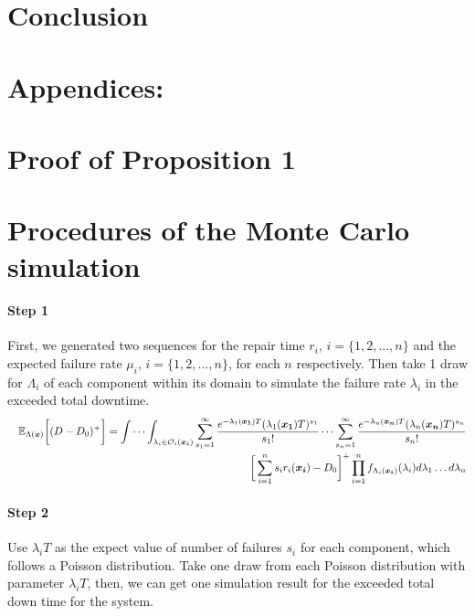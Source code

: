 \documentclass[preprint,12pt]{elsarticle}
\begin{document}
\section{Conclusion}
\section{Appendices:}
\appendix
\section{Proof of Proposition 1}
\label{Pro1}
\section{Procedures of the Monte Carlo simulation}
\paragraph{Step 1}

First, we generated two sequences for the repair time $r_{i}$, $i=\{1,2,...,n\}$ and the expected failure rate $\mu_{i}$, $i=\{1,2,...,n\}$, for each $n$ respectively. Then take 1 draw for $\Lambda_{i}$ of each component within its domain to simulate the failure rate $\lambda_{i}$ in the exceeded total downtime.
\begin{eqnarray}
&& \mathbb{E}_{\Lambda(\boldsymbol{x})} \bigg[(D-D_0)^{+} \bigg]=
\idotsint_{\lambda_{i} \in \mathcal{O}_{i}(\boldsymbol{x_i})} \sum_{s_{1}=1}^{\infty}{ \frac{e^{-\lambda_{1}(\boldsymbol{x_{1}})T}(\lambda_{1}(\boldsymbol{x_{1}})T)^{s_{1}}}{s_{1}!}}\dots\sum_{s_{n}=1}^{\infty}{\frac{e^{-\lambda_{n}(\boldsymbol{x_{n}})T}(\lambda_{n}(\boldsymbol{x_{n}})T)^{s_{n}}}{s_{n}!}} \nonumber\\
 &&\bigg[\sum_{i=1}^{n}{s_{i}r_{i}(\boldsymbol{x_{i}})}-D_{0}\bigg]^{+}\prod_{i=1}^{n}{f_{\Lambda_{i}(\boldsymbol{x_{i}})}(\lambda_{i})d\lambda_{1}\dots d\lambda_{n}} \nonumber
\end{eqnarray}

\paragraph{Step 2}

Use $\lambda_{i}T$ as the expect value of number of failures $s_i$ for each component, which follows a Poisson distribution. Take one draw from each Poisson distribution with parameter $\lambda_{i}T$, then, we can get one simulation result for the exceeded total down time for the system.
\end{document}
